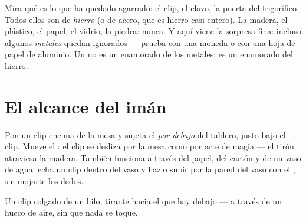 \begin{example}\label{ex:g1:magnets:iron}
Mira qué es lo que ha quedado agarrado: el clip, el clavo, la puerta
del frigorífico. Todos ellos son de \emph{hierro} (o de acero, que es
hierro casi entero). La madera, el plástico, el papel, el vidrio, la
piedra: nunca. Y aquí viene la sorpresa fina: incluso algunos
\emph{metales} quedan ignorados --- prueba con una moneda o con una
hoja de papel de aluminio. Un  no es un enamorado de los
metales; es un enamorado del hierro.
\end{example}

\section{El alcance del imán}

\begin{example}\label{ex:g1:magnets:through}
Pon un clip encima de la mesa y sujeta el  \emph{por debajo} del
tablero, justo bajo el clip. Mueve el : el clip se desliza por
la mesa como por arte de magia --- el tirón atraviesa la madera.
También funciona a través del papel, del cartón y de un vaso de agua:
echa un clip dentro del vaso y hazlo subir por la pared del vaso con
el , sin mojarte los dedos.
\end{example}

\begin{omfigure}

{\small Un clip colgado de un hilo, tirante hacia el  que hay
debajo --- a través de un hueco de aire, sin que nada se toque.}
\end{omfigure}

